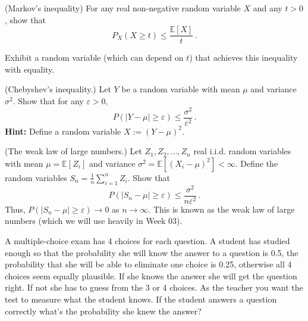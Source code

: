\documentclass[a4paper,10pt,landscape,twocolumn]{scrartcl}
\begin{document}
\homeworkproblems

\begin{exercise}
	\begin{subex}[(2pt)] (Markov's inequality) For any real non-negative random variable $X$ and any $t > 0$, show that
	\[
	P_X(X \geq t) \leq \frac{\mathbb{E}[X]}{t}\, .
	\]
\end{subex}
\begin{subex}[(1pt)]
	Exhibit a random variable (which can depend on $t$) that achieves this inequality with equality.
	\end{subex}

	\begin{subex}[(3pt)] (Chebyshev's inequality.) Let $Y$ be a random variable with mean $\mu$ and variance $\sigma^2$. Show that for any $\varepsilon > 0$,
	\[
	P(|Y - \mu| \geq \varepsilon) \leq \frac{\sigma^2}{\varepsilon^2} \, .
	\]
	\textbf{Hint:} Define a random variable $X := (Y - \mu)^2$.
	\end{subex}
	\begin{subex}[(3pt)] (The weak law of large numbers.) Let $Z_1, Z_2, ..., Z_n$ real i.i.d. random variables with mean $\mu = \mathbb{E}[Z_i]$ and variance $\sigma^2 = \mathbb{E}[(X_i - \mu)^2] < \infty$. Define the random variables $S_n = \frac{1}{n} \sum_{i=1}^n Z_i$. Show that
	\[
	P(|S_n - \mu | \geq \varepsilon) \leq \frac{\sigma^2}{n\varepsilon^2}\, .
	\]
	Thus, $P(|S_n - \mu| \geq \varepsilon) \to 0$ as $n \to \infty$. This is known as the weak law of large numbers (which we will use heavily in Week 03).
	\end{subex}
\end{exercise}

\begin{exercise}
A multiple-choice exam has 4 choices for each question. A student has studied enough so that the probability she will know the answer to a question is 0.5, the probability that she will be able to eliminate one choice is 0.25, otherwise all 4 choices seem equally plausible. If she knows the answer she will get the question right. If not she has to guess from the 3 or 4 choices.
As the teacher you want the test to measure what the student knows. If the student answers a question correctly what’s the probability she knew the answer?
\end{exercise}
\end{document}
